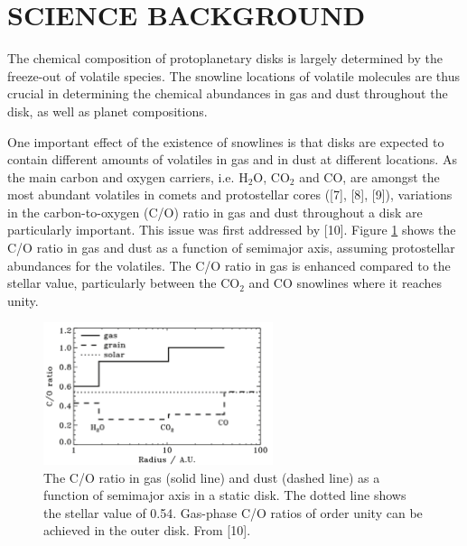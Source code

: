 \documentclass[12pt, letterpaper]{article}
\begin{document}
\section{SCIENCE BACKGROUND}


The chemical composition of protoplanetary disks is largely determined by the freeze-out of volatile species. The snowline locations of volatile molecules are thus crucial in determining the chemical abundances in gas and dust throughout the disk, as well as planet compositions. 

One important effect of the existence of snowlines is that disks are expected to contain different amounts of volatiles in gas and in dust at different locations. As the main carbon and oxygen carriers, i.e. H$_2$O, CO$_2$ and CO, are amongst the most abundant volatiles in comets and protostellar cores ([7], [8], [9]), variations in the carbon-to-oxygen (C/O) ratio in gas and dust throughout a disk are particularly important. This issue was first addressed by [10]. Figure \ref{fig:oberg} shows the C/O ratio in gas and dust as a function of semimajor axis, assuming protostellar abundances for the volatiles. The C/O ratio in gas is enhanced compared to the stellar value, particularly between the CO$_2$ and CO snowlines where it reaches unity. 

\begin{figure}[h!]
\centering
\includegraphics[width=0.6\textwidth]{oberg11.png}
\caption{The C/O ratio in gas (solid line) and dust (dashed line) as a function of semimajor axis in a static disk. The dotted line shows the stellar value of 0.54. Gas-phase C/O ratios of order unity can be achieved in the outer disk. From [10]. }
\label{fig:oberg}
\end{figure}
\end{document}
